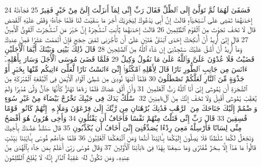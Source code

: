{\tiny\colorbox{cl_aya}{24}} فَسَقَىٰ لَهُمَا ثُمَّ تَوَلَّىٰٓ إِلَى ٱلظِّلِّ فَقَالَ رَبِّ إِنِّى لِمَآ أَنزَلْتَ إِلَىَّ مِنْ خَيْرٍ فَقِيرٌ
{\tiny\colorbox{cl_aya}{25}} فَجَآءَتْهُ إِحْدَىٰهُمَا تَمْشِى عَلَى ٱسْتِحْيَآءٍ قَالَتْ إِنَّ أَبِى يَدْعُوكَ لِيَجْزِيَكَ أَجْرَ مَا سَقَيْتَ لَنَا فَلَمَّا جَآءَهُۥ وَقَصَّ عَلَيْهِ ٱلْقَصَصَ قَالَ لَا تَخَفْ نَجَوْتَ مِنَ ٱلْقَوْمِ ٱلظَّٰلِمِينَ
{\tiny\colorbox{cl_aya}{26}} قَالَتْ إِحْدَىٰهُمَا يَٰٓأَبَتِ ٱسْتَـْٔجِرْهُ إِنَّ خَيْرَ مَنِ ٱسْتَـْٔجَرْتَ ٱلْقَوِىُّ ٱلْأَمِينُ
{\tiny\colorbox{cl_aya}{27}} قَالَ إِنِّىٓ أُرِيدُ أَنْ أُنكِحَكَ إِحْدَى ٱبْنَتَىَّ هَٰتَيْنِ عَلَىٰٓ أَن تَأْجُرَنِى ثَمَٰنِىَ حِجَجٍ فَإِنْ أَتْمَمْتَ عَشْرًا فَمِنْ عِندِكَ وَمَآ أُرِيدُ أَنْ أَشُقَّ عَلَيْكَ سَتَجِدُنِىٓ إِن شَآءَ ٱللَّهُ مِنَ ٱلصَّٰلِحِينَ
{\tiny\colorbox{cl_aya}{28}} قَالَ ذَٰلِكَ بَيْنِى وَبَيْنَكَ أَيَّمَا ٱلْأَجَلَيْنِ قَضَيْتُ فَلَا عُدْوَٰنَ عَلَىَّ وَٱللَّهُ عَلَىٰ مَا نَقُولُ وَكِيلٌ
{\tiny\colorbox{cl_aya}{29}} فَلَمَّا قَضَىٰ مُوسَى ٱلْأَجَلَ وَسَارَ بِأَهْلِهِۦٓ ءَانَسَ مِن جَانِبِ ٱلطُّورِ نَارًا قَالَ لِأَهْلِهِ ٱمْكُثُوٓا۟ إِنِّىٓ ءَانَسْتُ نَارًا لَّعَلِّىٓ ءَاتِيكُم مِّنْهَا بِخَبَرٍ أَوْ جَذْوَةٍ مِّنَ ٱلنَّارِ لَعَلَّكُمْ تَصْطَلُونَ
{\tiny\colorbox{cl_aya}{30}} فَلَمَّآ أَتَىٰهَا نُودِىَ مِن شَٰطِئِ ٱلْوَادِ ٱلْأَيْمَنِ فِى ٱلْبُقْعَةِ ٱلْمُبَٰرَكَةِ مِنَ ٱلشَّجَرَةِ أَن يَٰمُوسَىٰٓ إِنِّىٓ أَنَا ٱللَّهُ رَبُّ ٱلْعَٰلَمِينَ
{\tiny\colorbox{cl_aya}{31}} وَأَنْ أَلْقِ عَصَاكَ فَلَمَّا رَءَاهَا تَهْتَزُّ كَأَنَّهَا جَآنٌّ وَلَّىٰ مُدْبِرًا وَلَمْ يُعَقِّبْ يَٰمُوسَىٰٓ أَقْبِلْ وَلَا تَخَفْ إِنَّكَ مِنَ ٱلْءَامِنِينَ
{\tiny\colorbox{cl_aya}{32}} ٱسْلُكْ يَدَكَ فِى جَيْبِكَ تَخْرُجْ بَيْضَآءَ مِنْ غَيْرِ سُوٓءٍ وَٱضْمُمْ إِلَيْكَ جَنَاحَكَ مِنَ ٱلرَّهْبِ فَذَٰنِكَ بُرْهَٰنَانِ مِن رَّبِّكَ إِلَىٰ فِرْعَوْنَ وَمَلَإِي۟هِۦٓ إِنَّهُمْ كَانُوا۟ قَوْمًا فَٰسِقِينَ
{\tiny\colorbox{cl_aya}{33}} قَالَ رَبِّ إِنِّى قَتَلْتُ مِنْهُمْ نَفْسًا فَأَخَافُ أَن يَقْتُلُونِ
{\tiny\colorbox{cl_aya}{34}} وَأَخِى هَٰرُونُ هُوَ أَفْصَحُ مِنِّى لِسَانًا فَأَرْسِلْهُ مَعِىَ رِدْءًا يُصَدِّقُنِىٓ إِنِّىٓ أَخَافُ أَن يُكَذِّبُونِ
{\tiny\colorbox{cl_aya}{35}} قَالَ سَنَشُدُّ عَضُدَكَ بِأَخِيكَ وَنَجْعَلُ لَكُمَا سُلْطَٰنًا فَلَا يَصِلُونَ إِلَيْكُمَا بِـَٔايَٰتِنَآ أَنتُمَا وَمَنِ ٱتَّبَعَكُمَا ٱلْغَٰلِبُونَ
{\tiny\colorbox{cl_aya}{36}} فَلَمَّا جَآءَهُم مُّوسَىٰ بِـَٔايَٰتِنَا بَيِّنَٰتٍ قَالُوا۟ مَا هَٰذَآ إِلَّا سِحْرٌ مُّفْتَرًى وَمَا سَمِعْنَا بِهَٰذَا فِىٓ ءَابَآئِنَا ٱلْأَوَّلِينَ
{\tiny\colorbox{cl_aya}{37}} وَقَالَ مُوسَىٰ رَبِّىٓ أَعْلَمُ بِمَن جَآءَ بِٱلْهُدَىٰ مِنْ عِندِهِۦ وَمَن تَكُونُ لَهُۥ عَٰقِبَةُ ٱلدَّارِ إِنَّهُۥ لَا يُفْلِحُ ٱلظَّٰلِمُونَ
